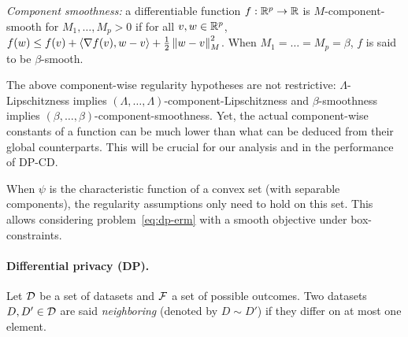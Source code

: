 \textit{Component smoothness:} a differentiable function $f : \mathbb R^p
  \rightarrow \mathbb R$ is
$M$-component-smooth for $M_1,\dots,M_p > 0$ if
for all $v, w \in \mathbb R^p$,
$f(w) \le f(v) + \left\langle \nabla f(v), w - v \right\rangle + \frac{1}{2}\left \lVert w - v \right \rVert_{M}^2$.
When $M_1=\dots=M_p=\beta$, $f$ is said to be $\beta$-smooth.

The above component-wise regularity hypotheses are not restrictive:
$\Lambda$-Lipschitzness
implies $(\Lambda, \dots, \Lambda)$-component-Lipschitzness and
$\beta$-smoothness implies $(\beta, \dots, \beta)$-component-smoothness.
Yet, the actual component-wise constants of a function can be much
lower than what can be deduced from their global counterparts.
This will be crucial for our analysis and in the performance of DP-CD.

\begin{remark}
  \label{rmq:constrained-regularity-assumptions}
  When $\psi$ is the characteristic function of a convex set (with separable
  components), the regularity assumptions only need to hold on this
  set. This allows considering problem~\eqref{eq:dp-erm} with a smooth
  objective under box-constraints.
\end{remark}




\paragraph{Differential privacy (DP).}

Let $\mathcal D$ be a set of datasets and $\mathcal F$ a set of possible outcomes.
Two datasets $D, D' \in \mathcal D$ are said \textit{neighboring}
(denoted by $D \sim D'$) if they differ on at most one element.

